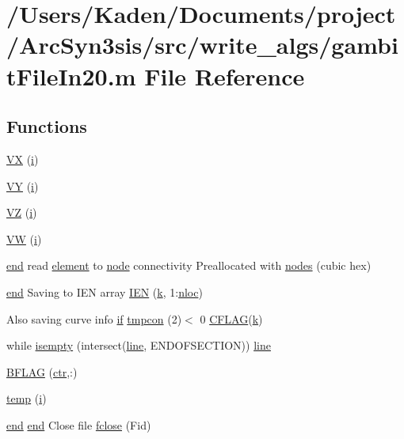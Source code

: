 \hypertarget{a00608}{}\section{/\+Users/\+Kaden/\+Documents/project/\+Arc\+Syn3sis/src/write\+\_\+algs/gambit\+File\+In20.m File Reference}
\label{a00608}
\subsection*{Functions}
\begin{DoxyCompactItemize}
\item 
\hyperlink{a00608_a6339563199f1df5b474ae537cd435e9b}{VX} (\hyperlink{a00608_afb6aca53df96564f2adf086c942453ec}{i})
\item 
\hyperlink{a00608_a2f2925c90dcdcd0458fa06a0d2fc2fc4}{VY} (\hyperlink{a00608_afb6aca53df96564f2adf086c942453ec}{i})
\item 
\hyperlink{a00608_a19fb6d0c72728c85075e94ea04a60a66}{VZ} (\hyperlink{a00608_afb6aca53df96564f2adf086c942453ec}{i})
\item 
\hyperlink{a00608_a279fc4bc04d1e6cb4941402ba6e29874}{VW} (\hyperlink{a00608_afb6aca53df96564f2adf086c942453ec}{i})
\item 
\hyperlink{a00608_afb358f48b1646c750fb9da6c6585be2b}{end} read \hyperlink{a00611_a4998e7f4989562d1ed06579e07265c30}{element} to \hyperlink{a00611_adf51fe9945b6ca147057cc27ff639d0f}{node} connectivity Preallocated with \hyperlink{a00608_a9fd973fb7dcbed4123ae5eb2f3868e61}{nodes} (cubic hex)
\item 
\hyperlink{a00608_afb358f48b1646c750fb9da6c6585be2b}{end} Saving to I\+EN array \hyperlink{a00608_ada37e689768b959686f183a3d534464b}{I\+EN} (\hyperlink{a00605_a6086917dfee54d84abe1838505c8cf69}{k}, 1\+:\hyperlink{a00608_af770575536260d1af58b8fddaaefb98d}{nloc})
\item 
Also saving curve info \hyperlink{a00614_a96c738d3e2120c4273f9d4390761d99e}{if} \hyperlink{a00608_ac90fbb5b14a3c144a13164ba8eff726a}{tmpcon} (2)$<$ 0 \hyperlink{a00608_a10675f132896e92909100dff33d2eca1}{C\+F\+L\+AG}(\hyperlink{a00605_a6086917dfee54d84abe1838505c8cf69}{k})
\item 
while \hyperlink{a00608_ad2a182e2e8932167c056732723f13e1c}{isempty} (intersect(\hyperlink{a00608_a1d1b0d42391bd99b4214d9216b163807}{line}, \textquotesingle{}E\+N\+D\+O\+F\+S\+E\+C\+T\+I\+ON\textquotesingle{})) \hyperlink{a00608_a1d1b0d42391bd99b4214d9216b163807}{line}
\item 
\hyperlink{a00608_a2631e3df74fb2c7ff87a8ab5c4dabd4b}{B\+F\+L\+AG} (\hyperlink{a00608_a7a8898e9362126201efe22332c961613}{ctr},\+:)
\item 
\hyperlink{a00608_a66be333d3079c1ecfec40ed090608507}{temp} (\hyperlink{a00608_afb6aca53df96564f2adf086c942453ec}{i})
\item 
\hyperlink{a00608_afb358f48b1646c750fb9da6c6585be2b}{end} \hyperlink{a00608_afb358f48b1646c750fb9da6c6585be2b}{end} Close file \hyperlink{a00608_a0493b72e01e669899778919fed741667}{fclose} (Fid)
\end{DoxyCompactItemize}
